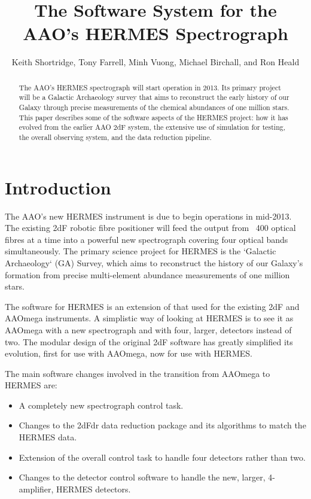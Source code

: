 \documentclass[11pt,twoside]{article}
\begin{document}

\title{The Software System for the AAO's HERMES Spectrograph}
\author{Keith Shortridge, Tony Farrell, Minh Vuong, Michael Birchall, and Ron Heald
}

\begin{abstract}
The AAO's HERMES spectrograph will start operation in 2013. Its primary project will be a Galactic Archaeology survey that aims to reconstruct the early history of our Galaxy through precise measurements of the chemical abundances of one million stars. This paper describes some of the software aspects of the HERMES project: how it has evolved from the earlier AAO 2dF system, the extensive use of simulation for testing, the overall observing system, and the data reduction pipeline.
\end{abstract}

\section{Introduction}

The AAO's new HERMES instrument \citep{Hermes_2010} is due to begin operations in mid-2013. The existing 2dF robotic fibre positioner will feed the output from ~400 optical fibres at a time into a powerful new spectrograph covering four optical bands simultaneously. The primary science project for HERMES is the ‘Galactic Archaeology‘ (GA) Survey, which aims to reconstruct the history of our Galaxy's formation from precise multi-element abundance measurements of one million stars.

The software for HERMES is an extension of that used for the existing 2dF and AAOmega instruments. A simplistic way of looking at HERMES is to see it as AAOmega with a new spectrograph and with four, larger, detectors instead of two. The modular design of the original 2dF software has greatly simplified its evolution, first for use with AAOmega, now for use with HERMES.

The main software changes involved in the transition from AAOmega to HERMES are:

\begin{itemize}
\itemsep0em
\item A completely new spectrograph control task.
\item Changes to the 2dFdr data reduction package and its algorithms to match the HERMES data.
\item Extension of the overall control task to handle four detectors rather than two.
\item Changes to the detector control software to handle the new, larger, 4-amplifier, HERMES detectors.
\end{itemize}
\end{document}
